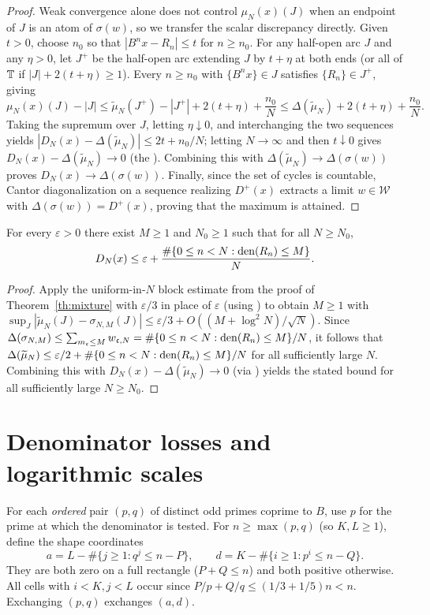 \documentclass[11pt]{article}
\begin{document}
\begin{proof}
Weak convergence alone does not control $\mu_N(x)(J)$ when an endpoint of $J$ is an atom of $\sigma(w)$, so we transfer the scalar discrepancy directly. Given $t>0$, choose $n_0$ so that $|B^n x-R_n|\le t$ for $n\ge n_0$. For any half-open arc $J$ and any $\eta>0$, let $J^+$ be the half-open arc extending $J$ by $t+\eta$ at both ends (or all of $\mathbb T$ if $|J|+2(t+\eta)\ge1$). Every $n\ge n_0$ with $\{B^n x\}\in J$ satisfies $\{R_n\}\in J^+$, giving
\[
 \mu_N(x)(J)-|J|\le \widetilde\mu_N(J^+)-|J^+|+2(t+\eta)+\frac{n_0}N
 \le \Delta(\widetilde\mu_N)+2(t+\eta)+\frac{n_0}N.
\]
Taking the supremum over $J$, letting $\eta\downarrow0$, and interchanging the two sequences yields $|D_N(x)-\Delta(\widetilde\mu_N)|\le 2t+n_0/N$; letting $N\to\infty$ and then $t\downarrow0$ gives $D_N(x)-\Delta(\widetilde\mu_N)\to0$ (the ). Combining this with $\Delta(\widetilde\mu_N)\to\Delta(\sigma(w))$ proves $D_N(x)\to\Delta(\sigma(w))$. Finally, since the set of cycles is countable, Cantor diagonalization on a sequence realizing $D^+(x)$ extracts a limit $w\in\mathcal W$ with $\Delta(\sigma(w))=D^+(x)$, proving that the maximum is attained.
\end{proof}

\begin{lemma}\label{lem:uniform}
For every $\varepsilon>0$ there exist $M\ge1$ and $N_0\ge1$ such that for all $N\ge N_0$,
\[
 D_N(x)\le \varepsilon+\frac{\#\{0\le n<N:\operatorname{den}(R_n)\le M\}}{N}.
\]
\end{lemma}
\begin{proof}
Apply the uniform-in-$N$ block estimate from the proof of Theorem~\ref{th:mixture} with $\varepsilon/3$ in place of $\varepsilon$ (using ) to obtain $M\ge1$ with $\sup_J|\widetilde\mu_N(J)-\sigma_{N,M}(J)|\le\varepsilon/3+O((M+\log^2 N)/\sqrt N)$. Since $\Delta(\sigma_{N,M})\le\sum_{m_{\mathfrak c}\le M}w_{\mathfrak c,N}=\#\{0\le n<N:\operatorname{den}(R_n)\le M\}/N$, it follows that $\Delta(\widetilde\mu_N)\le\varepsilon/2+\#\{0\le n<N:\operatorname{den}(R_n)\le M\}/N$ for all sufficiently large $N$. Combining this with $D_N(x)-\Delta(\widetilde\mu_N)\to0$ (via ) yields the stated bound for all sufficiently large $N\ge N_0$.
\end{proof}

\section{Denominator losses and logarithmic scales}\label{sec:local}
For each \emph{ordered} pair $(p,q)$ of distinct odd primes coprime to $B$, use $p$ for the prime at which the denominator is tested. For $n\ge\max(p,q)$ (so $K,L\ge1$), define the shape coordinates
\[
 a=L-\#\{j\ge1: q^j\le n-P\},\qquad
 d=K-\#\{i\ge1: p^i\le n-Q\}.
\]
They are both zero on a full rectangle ($P+Q\le n$) and both positive otherwise. All cells with $i<K,j<L$ occur since $P/p+Q/q\le(1/3+1/5)n<n$. Exchanging $(p,q)$ exchanges $(a,d)$.
\end{document}
